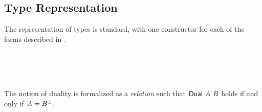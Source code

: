 \begin{code}[hide]%
\>[0]\AgdaSpace{}%
\AgdaSpace{}%
\AgdaSpace{}%
\AgdaSpace{}%
\AgdaSymbol{(}\AgdaSymbol{;}\AgdaSpace{}%
\AgdaSymbol{;}\AgdaSpace{}%
\AgdaSymbol{;}\AgdaSpace{}%
\AgdaSymbol{)}\<%
\end{code}

\subsection{Type Representation}
\label{sec:type-agda}

The representation of types is standard, with one constructor for each of the
forms described in .

\begin{code}%
\>[0]\AgdaSpace{}%
\AgdaSpace{}%
\AgdaSymbol{:}\AgdaSpace{}%
\AgdaSpace{}%
\<%
\\
\>[0][@{}l@{\AgdaIndent{0}}]%
\>[2]\AgdaSpace{}%
\AgdaSpace{}%
\AgdaSpace{}%
%
\>[19]\AgdaSymbol{:}\AgdaSpace{}%
\<%
\\
%
\>[2]\AgdaSpace{}%
%
\>[19]\AgdaSymbol{:}\AgdaSpace{}%
\AgdaSpace{}%
\AgdaSpace{}%
\<%
\\
%
\>[2]\AgdaOperator{\AgdaInductiveConstructor{\AgdaUnderscore{}\&\AgdaUnderscore{}}}\AgdaSpace{}%
\AgdaSpace{}%
\AgdaSpace{}%
%
\>[19]\AgdaSymbol{:}\AgdaSpace{}%
\AgdaSpace{}%
\AgdaSpace{}%
\AgdaSpace{}%
\AgdaSpace{}%
\<%
\end{code}

The notion of duality is formalized as a \emph{relation} 
such that $\AgdaDatatype{Dual}~A~B$ holds if and only if $A = B^{\bot}$.

